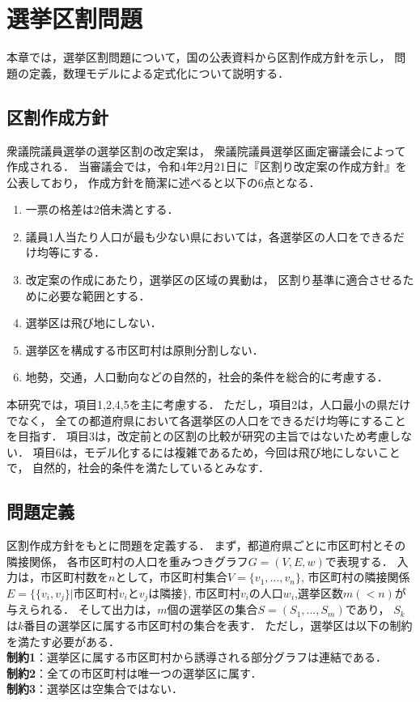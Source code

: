 \chapter{選挙区割問題} \label{chapter:2}

本章では，選挙区割問題について，国の公表資料から区割作成方針を示し，
問題の定義，数理モデルによる定式化について説明する．

\section{区割作成方針}
衆議院議員選挙の選挙区割の改定案は，
衆議院議員選挙区画定審議会によって作成される．
当審議会では，令和4年2月21日に『区割り改定案の作成方針』を公表しており，
作成方針を簡潔に述べると以下の6点となる．
\begin{enumerate}
    \item 一票の格差は2倍未満とする．
    \item 議員1人当たり人口が最も少ない県においては，各選挙区の人口をできるだけ均等にする．
    \item 改定案の作成にあたり，選挙区の区域の異動は，
    区割り基準に適合させるために必要な範囲とする．
    \item 選挙区は飛び地にしない．
    \item 選挙区を構成する市区町村は原則分割しない．
    \item 地勢，交通，人口動向などの自然的，社会的条件を総合的に考慮する．
\end{enumerate}

本研究では，項目1,2,4,5を主に考慮する．
ただし，項目2は，人口最小の県だけでなく，
全ての都道府県において各選挙区の人口をできるだけ均等にすることを目指す．
項目3は，改定前との区割の比較が研究の主旨ではないため考慮しない．
項目6は，モデル化するには複雑であるため，今回は飛び地にしないことで，
自然的，社会的条件を満たしているとみなす．

\section{問題定義}

区割作成方針をもとに問題を定義する．
まず，都道府県ごとに市区町村とその隣接関係，
各市区町村の人口を重みつきグラフ$G=(V, E, w)$で表現する．
入力は，市区町村数を$n$として，市区町村集合$V=\{v_1,...,v_n\}$, 
市区町村の隣接関係$E=\{\{v_i,v_j\}|$市区町村$v_i$と$v_j$は隣接$\}$, 
市区町村$v_i$の人口$w_i$,選挙区数$m(<n)$が与えられる．
そして出力は，$m$個の選挙区の集合$S=(S_1,...,S_m)$であり，
$S_k$は$k$番目の選挙区に属する市区町村の集合を表す．
ただし，選挙区は以下の制約を満たす必要がある．\\
\quad\textbf{制約1}：選挙区に属する市区町村から誘導される部分グラフは連結である．\\
\quad\textbf{制約2}：全ての市区町村は唯一つの選挙区に属す．\\
\quad\textbf{制約3}：選挙区は空集合ではない．


